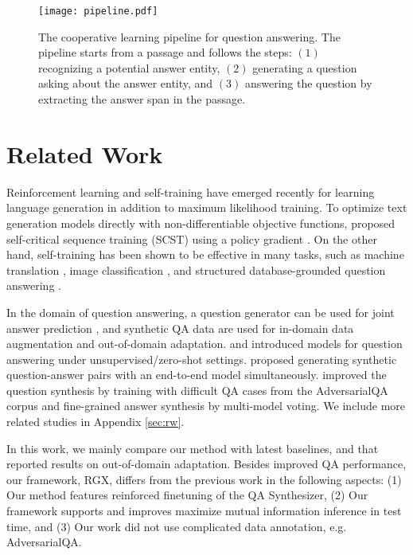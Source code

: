 \documentclass[11pt,a4paper]{article}
\begin{document}
\begin{figure*}[h]
\centering
\texttt{[image: pipeline.pdf]}
\caption{The cooperative learning pipeline for question answering. The pipeline starts from a passage and follows the steps: $(1)$ recognizing a potential answer entity, $(2)$ generating a question asking about the answer entity, and $(3)$ answering the question by extracting the answer span in the passage.}
\label{fig:pipeline}
\end{figure*}
\section{Related Work}








Reinforcement learning and self-training have emerged recently for learning language generation in addition to maximum likelihood training. To optimize text generation models directly with non-differentiable objective functions, \citet{rennie2017self} proposed self-critical sequence training (SCST) using a policy gradient \cite{kakade2001natural,silver2014deterministic}. On the other hand, self-training has been shown to be effective in many tasks, such as machine translation \cite{he2019revisiting}, image classification \cite{xie2020self}, and structured database-grounded question answering \cite{xu2020autoqa}.

In the domain of question answering, a question generator can be used for joint answer prediction \cite{tang2017question,duan2017question}, and synthetic QA data are used for in-domain data augmentation \cite{sachan2018self,puri2020training,liu2020tell,klein2019learning} and out-of-domain adaptation. \citet{lewis2019unsupervised} and \citet{lee2020generating} introduced models for question answering under unsupervised/zero-shot settings. \citet{shakeri2020end} proposed generating synthetic question-answer pairs with an end-to-end model simultaneously. \citet{bartolo2021improving} improved the question synthesis by training with difficult QA cases from the AdversarialQA corpus \cite{bartolo2020beat} and fine-grained answer synthesis by multi-model voting. We include more related studies in Appendix \ref{sec:rw}.

In this work, we mainly compare our method with latest baselines, \citet{shakeri2020end} and \citet{bartolo2021improving} that reported results on out-of-domain adaptation. Besides improved QA performance, our framework, RGX, differs from the previous work in the following aspects: (1) Our method features reinforced finetuning of the QA Synthesizer, (2) Our framework supports and improves maximize mutual information inference in test time, and (3) Our work did not use complicated data annotation, e.g. AdversarialQA.
\end{document}
